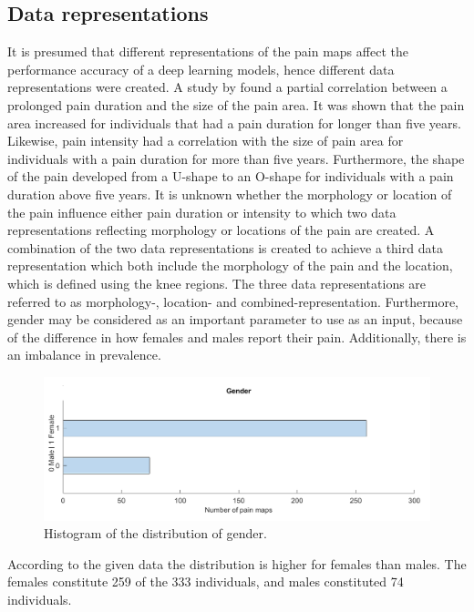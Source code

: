 \subsection{Data representations} \label{sec:representation}
It is presumed that different representations of the pain maps affect the performance accuracy of a deep learning models, hence different data representations were created.
A study by \citeauthor{Boudreau2017} \citep{Boudreau2017} found a partial correlation between a prolonged pain duration and the size of the pain area. It was shown that the pain area increased for individuals that had a pain duration for longer than five years. Likewise, pain intensity had a correlation with the size of pain area for individuals with a pain duration for more than five years. Furthermore, the shape of the pain developed from a U-shape to an O-shape for individuals with a pain duration above five years.\citep{Boudreau2017} \newline
\noindent
It is unknown whether the morphology or location of the pain influence either pain duration or intensity to which two data representations reflecting morphology or locations of the pain are created.
A combination of the two data representations is created to achieve a third data representation which both include the morphology of the pain and the location, which is defined using the knee regions. The three data representations are referred to as morphology-, location- and combined-representation.
\noindent
Furthermore, gender may be considered as an important parameter to use as an input, because of the difference in how females and males report their pain. Additionally, there is an imbalance in prevalence.

\begin{figure} [H]
\centering
\includegraphics[width=1\textwidth]{figures/histoGender}
\caption{Histogram of the distribution of gender.}
\label{fig:histogender}
\end{figure}

\noindent
According to the given data the distribution is higher for females than males. The females constitute 259 of the 333 individuals, and males constituted 74 individuals.  \newpage

